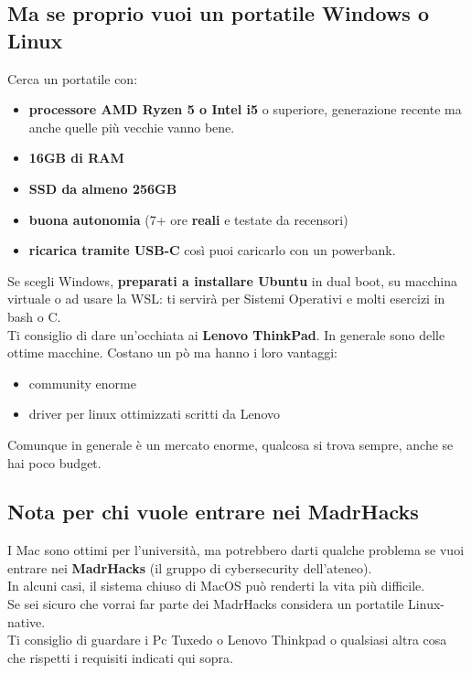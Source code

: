 \documentclass[18pt]{extarticle}
\begin{document}
\subsection{Ma se proprio vuoi un portatile Windows o Linux}
Cerca un portatile con:
\begin{itemize}
\item \textbf{processore AMD Ryzen 5 o Intel i5} o superiore, generazione recente ma anche quelle più vecchie vanno bene.
\item \textbf{16GB di RAM}
\item \textbf{SSD da almeno 256GB}
\item \textbf{buona autonomia} (7+ ore \textbf{reali} e testate da recensori)
\item \textbf{ricarica tramite USB-C} così puoi caricarlo con un powerbank.
\end{itemize}%
Se scegli Windows, \textbf{preparati a installare Ubuntu} in dual boot, su macchina virtuale o ad usare la WSL: ti servirà per Sistemi Operativi e molti esercizi in bash o C.\\
Ti consiglio di dare un'occhiata ai \textbf{Lenovo ThinkPad}. In generale sono delle ottime macchine. Costano un pò ma hanno i loro vantaggi:
\begin{itemize}
\item community enorme
\item driver per linux ottimizzati scritti da Lenovo
\end{itemize}%
Comunque in generale è un mercato enorme, qualcosa si trova sempre, anche se hai poco budget.


\subsection{Nota per chi vuole entrare nei MadrHacks}
I Mac sono ottimi per l’università, ma potrebbero darti qualche problema se vuoi entrare nei \textbf{MadrHacks} (il gruppo di cybersecurity dell’ateneo).\\
In alcuni casi, il sistema chiuso di MacOS può renderti la vita più difficile.\\
Se sei sicuro che vorrai far parte dei MadrHacks considera un portatile Linux-native.\\
Ti consiglio di guardare i Pc Tuxedo o Lenovo Thinkpad o qualsiasi altra cosa che rispetti i requisiti indicati qui sopra.
\end{document}
